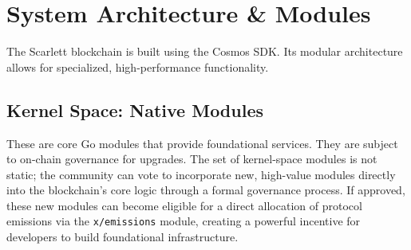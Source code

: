 \documentclass[10pt]{article}
\begin{document}
\section{System Architecture \& Modules}
The Scarlett blockchain is built using the Cosmos SDK. Its modular architecture allows for specialized, high-performance functionality.

\subsection{Kernel Space: Native Modules}
These are core Go modules that provide foundational services. They are subject to on-chain governance for upgrades. The set of kernel-space modules is not static; the community can vote to incorporate new, high-value modules directly into the blockchain's core logic through a formal governance process. If approved, these new modules can become eligible for a direct allocation of protocol emissions via the \texttt{x/emissions} module, creating a powerful incentive for developers to build foundational infrastructure.
\end{document}
